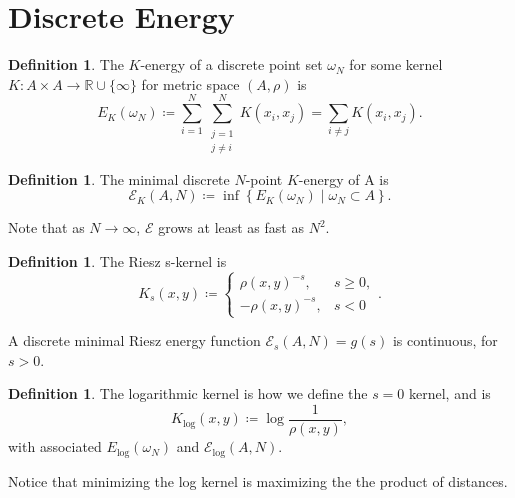 \documentclass[12pt]{article}
\theoremstyle{definition}
\newtheorem{definition}[thm]{Definition}
\begin{document}
\section{Discrete Energy}
\begin{definition}
  The \( K \)-energy of a discrete point set \( \omega_N \) for some kernel \( K: A \times A \rightarrow \mathbb{R} \cup \{\infty\} \) for metric space \( (A, \rho) \) is
  \begin{equation}
  \label{eq:1}
  E_K(\omega_N) \coloneq \sum\limits_{i=1}^N \sum\limits_{\substack{j = 1 \\ j \neq i}}^N K(x_i, x_j) = \sum\limits_{i \neq j} K(x_i, x_{j}).
  \end{equation}
\end{definition}

\begin{definition}
  The minimal discrete \( N \)-point \( K \)-energy of A is
  \begin{equation}
  \label{eq:2}
  \mathcal{E}_K(A,N) \coloneq \inf \left\{ E_K(\omega_N) \mid \omega_N \subset A \right\}.
  \end{equation}
\end{definition}

Note that as \( N \rightarrow \infty \), \( \mathcal{E} \) grows at least as fast as \( N^2 \).

\begin{definition}
  The Riesz s-kernel is
  \begin{equation}
  \label{eq:3}
  K_s(x,y) \coloneq \begin{cases}
    \rho(x,y)^{-s}, & s\geq 0, \\
    -\rho(x,y)^{-s}, & s < 0
  \end{cases}.
  \end{equation}
\end{definition}

A discrete minimal Riesz energy function \( \mathcal{E}_s(A,N) = g(s) \) is continuous, for \( s > 0 \).

\begin{definition}
  The logarithmic kernel is how we define the \( s=0 \) kernel, and is
  \begin{equation}
  \label{eq:4}
  K_{\log}(x,y) \coloneq \log \frac{1}{\rho(x,y)},
  \end{equation}
  with associated \( E_{\log}(\omega_N) \) and \( \mathcal{E}_{\log}(A,N) \).
\end{definition}

Notice that minimizing the log kernel is maximizing the the product of distances.
\end{document}
